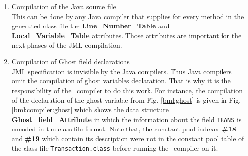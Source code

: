 \begin{enumerate}
\item Compilation of the Java source file \\
  This can be done by any Java compiler that supplies for every method in the generated class file 
  the \textbf{Line\_Number\_Table}  and \textbf{Local\_Variable\_Table}  attributes. 
   Those attributes are important for the next phases of the JML compilation.

\item Compilation of Ghost field declarations \\
      JML specification is invisible by the 
      Java compilers. Thus Java compilers omit the compilation of ghost variables declaration.
      That is why it is the responsibility of the \JMLtoBML \  compiler to do this work. 
      For instance, the compilation of the declaration of the ghost variable from
      Fig. \ref{bml:ghost} is given in Fig.\ref{bml:compiler:ghost} which shows the data structure \textbf{Ghost\_field\_Attribute}
      in which the information about the field
      \texttt{TRANS} is encoded in the class file format. 
      Note that,  the constant pool indexes \textbf{\#18} and \textbf{\#19}  which contain its description were not in the constant
      pool table of the class file \texttt{Transaction.class} before running the \JMLtoBML \ compiler on it. 
\begin{figure}[ht!]
\end{figure}
\end{enumerate}
